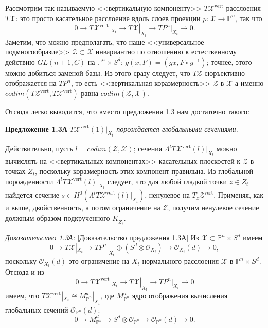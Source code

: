 Рассмотрим так называемую <<вертикальную
компоненту>> $T\mathcal{X}^{\mathrm{vert}}$ расслоения $T\mathcal{X}$: это просто касательное
расслоение
вдоль слоев проекции $p \colon\mathcal{X}\rightarrow \mathbb{P}^n$, так что
$$
0\rightarrow T\mathcal{X}^{\mathrm{vert}}|_{X_t}\rightarrow T\mathcal{X}|_{X_t} \rightarrow
TP^n|_{X_t}\rightarrow 0.
$$
Заметим, что можно предполагать, что наше
<<универсальное подмногообразие>> $\mathcal{Z}\subset \mathcal{X}$ инвариантно
по отношению к естественному действию $GL(n+1, C)$ на $\mathbb{P}^n\times S^d$:
$g(x, F)=(gx, F\circ g^{-1})$; точнее, этого можно добиться заменой базы.
Из этого сразу следует, что
$T\mathcal{Z}$ сюръективно отображается на $TP^n$, то есть
<<вертикальная коразмерность>> $\mathcal{Z}$ в $\mathcal{X}$ а именно
$codim (T\mathcal{Z}^{\mathrm{vert}}, T\mathcal{X}^{\mathrm{vert}})$
равна $codim(\mathcal{Z},\mathcal{X})$.

Отсюда легко выводится, что вместо предложения 1.3 нам достаточно
такого:

\medskip
{\bf Предложение 1.3А}
{\it
$T\mathcal{X}^{\mathrm{vert}}(1)|_{X_t}$ порождается
глобальными сечениями.
}

\medskip
Действительно, пусть $l=codim(\mathcal{Z},\mathcal{X})$; сечения $\Lambda^lT\mathcal{X}^{\mathrm{vert}}(l)|_{X_t}$
можно вычислять на <<вертикальных
компонентах>> касательных плоскостей к $\mathcal{Z}$ в точках $Z_t$, поскольку коразмерность
этих компонент правильна. Из глобальной порожденности
$\Lambda^lT\mathcal{X}^{\mathrm{vert}}(l)|_{X_t}$
следует, что для любой гладкой точки $z\in  Z_t$ найдется сечение
$s\in H^0(\Lambda^lT\mathcal{X}^{\mathrm{vert}}(l)|_{X_t})$, ненулевое на $T_z\mathcal{Z}^{\mathrm{vert}}$.
Применяя, как и выше, двойственность, а потом ограничение на $\mathcal{Z}$, получим ненулевое сечение должным образом подкрученного
$K_{\tilde{Z}_t}$.

\medskip
\textit{Доказательство 1.3А:}
[Доказательство предложения \textup{1.3А}]
Из $\mathcal{X}\subset \mathbb{P}^n\times S^d$ имеем
$$
0 \rightarrow T\mathcal{X}|_{X_t}\rightarrow TP^n|_{X_t}\oplus
(S^d\otimes \mathcal{O}_{X_t})\rightarrow \mathcal{O}_{X_t}(d)\rightarrow 0,
$$
поскольку $\mathcal{O}_{X_t}(d)$ это ограничение на ${X_t}$ нормального
расслоения $\mathcal{X}$ в $\mathbb{P}^n\times S^d$. Отсюда и из
$$
0\rightarrow T\mathcal{X}^{\mathrm{vert}}|_{X_t}\rightarrow T\mathcal{X}|_{X_t} \rightarrow
TP^n|_{X_t}\rightarrow 0
$$
имеем, что
$T\mathcal{X}^{\mathrm{vert}}|_{X_t}\cong M^d_{\mathbb{P}^n}|_{X_t}$, где $M^d_{\mathbb{P}^n}$ ядро
отображения вычисления глобальных сечений $\mathcal{O}_{\mathbb{P}^n}(d)$:
$$
0\rightarrow M^d_{\mathbb{P}^n} \rightarrow S^d\otimes \mathcal{O}_{\mathbb{P}^n}\rightarrow
\mathcal{O}_{\mathbb{P}^n}(d)\rightarrow 0.
$$

